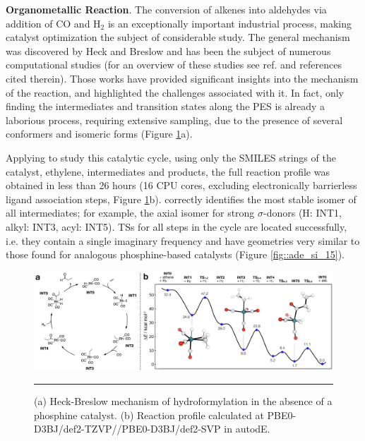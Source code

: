 \documentclass[../../main.tex]{subfiles}
\begin{document}
{\bfseries{Organometallic Reaction}}. The conversion of alkenes into aldehydes via addition of CO and H$_2$ is an exceptionally important industrial process, making catalyst optimization the subject of considerable study.\cite{Franke2012} The general mechanism was discovered by Heck and Breslow\cite{Heck1961} and has been the subject of numerous computational studies (for an overview of these studies see ref. \cite{Kegl2015} and references cited therein). Those works have provided significant insights into the mechanism of the reaction, and highlighted the challenges associated with it. In fact, only finding the intermediates and transition states along the PES is already a laborious process, requiring extensive sampling, due to the presence of several conformers and isomeric forms (Figure \ref{fig::ade_8}a).

Applying \ade to study this catalytic cycle, using only the SMILES strings of the catalyst, ethylene, intermediates and products, the full reaction profile was obtained in less than 26 hours (16 CPU cores, excluding electronically barrierless ligand association steps, Figure \ref{fig::ade_8}b). \ade correctly identifies the most stable isomer of all intermediates; for example, the axial isomer for strong $\sigma$-donors (H: INT1, alkyl: INT3, acyl: INT5). TSs for all steps in the cycle are located successfully, i.e. they contain a single imaginary frequency and have geometries very similar to those found for analogous phosphine-based catalysts (Figure \ref{fig::ade_si_15}).\cite{Decker2001}


\begin{figure}
	
	\vspace{0.2cm}
	\centering
	\includegraphics[width=\textwidth]{5/autode/figs/fig8}
	\vspace{0.2cm}
	\hrule
	\caption{(a) Heck-Breslow mechanism of hydroformylation in the absence of a phosphine catalyst. (b) Reaction profile calculated at PBE0-D3BJ/def2-TZVP//PBE0-D3BJ/def2-SVP in autodE.}
	\label{fig::ade_8}
	
\end{figure}
\end{document}
